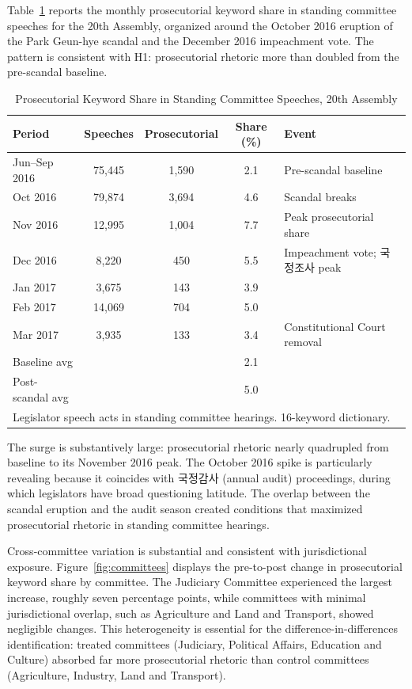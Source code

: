 \documentclass[11pt]{article}
\begin{document}
Table~\ref{tab:rhetoric} reports the monthly prosecutorial keyword share in standing committee speeches for the 20th Assembly, organized around the October 2016 eruption of the Park Geun-hye scandal and the December 2016 impeachment vote. The pattern is consistent with H1: prosecutorial rhetoric more than doubled from the pre-scandal baseline.

\begin{table}[htbp]
\centering
\caption{Prosecutorial Keyword Share in Standing Committee Speeches, 20th Assembly}
\label{tab:rhetoric}
\begin{tabular}{lcccl}
\toprule
Period & Speeches & Prosecutorial & Share (\%) & Event \\
\midrule
Jun--Sep 2016 & 75,445 & 1,590 & 2.1 & Pre-scandal baseline \\
Oct 2016 & 79,874 & 3,694 & 4.6 & Scandal breaks \\
Nov 2016 & 12,995 & 1,004 & 7.7 & Peak prosecutorial share \\
Dec 2016 & 8,220 & 450 & 5.5 & Impeachment vote; 국정조사 peak \\
Jan 2017 & 3,675 & 143 & 3.9 & \\
Feb 2017 & 14,069 & 704 & 5.0 & \\
Mar 2017 & 3,935 & 133 & 3.4 & Constitutional Court removal \\
\midrule
Baseline avg & & & 2.1 & \\
Post-scandal avg & & & 5.0 & \\
\bottomrule
\multicolumn{5}{l}{\footnotesize Legislator speech acts in standing committee hearings. 16-keyword dictionary.} \\
\end{tabular}
\end{table}

The surge is substantively large: prosecutorial rhetoric nearly quadrupled from baseline to its November 2016 peak. The October 2016 spike is particularly revealing because it coincides with 국정감사 (annual audit) proceedings, during which legislators have broad questioning latitude. The overlap between the scandal eruption and the audit season created conditions that maximized prosecutorial rhetoric in standing committee hearings.

Cross-committee variation is substantial and consistent with jurisdictional exposure. Figure~\ref{fig:committees} displays the pre-to-post change in prosecutorial keyword share by committee. The Judiciary Committee experienced the largest increase, roughly seven percentage points, while committees with minimal jurisdictional overlap, such as Agriculture and Land and Transport, showed negligible changes. This heterogeneity is essential for the difference-in-differences identification: treated committees (Judiciary, Political Affairs, Education and Culture) absorbed far more prosecutorial rhetoric than control committees (Agriculture, Industry, Land and Transport).
\end{document}
